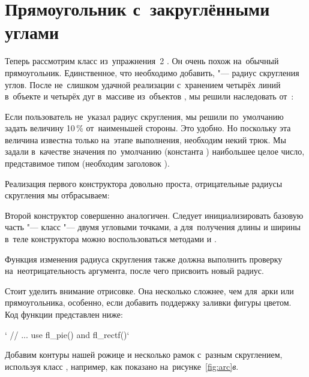 \section{Прямоугольник с~закруглёнными углами}
Теперь рассмотрим класс  из~упражнения~2 . Он очень похож на~обычный прямоугольник. Единственное, что необходимо добавить, "--- радиус скругления углов. После не~слишком удачной реализации с~хранением четырёх линий в~объекте  и четырёх дуг в~массиве из~объектов , мы решили наследовать от~:


Если пользователь не~указал радиус скругления, мы решили по~умолчанию задать величину 10\,\% от~наименьшей стороны. Это удобно. Но поскольку эта величина известна только на~этапе выполнения, необходим некий трюк. Мы задали в~качестве значения по~умолчанию (константа ) наибольшее целое число, представимое типом  (необходим заголовок ).

Реализация первого конструктора довольно проста, отрицательные радиусы скругления мы отбрасываем:


Второй конструктор совершенно аналогичен. Следует инициализировать базовую часть "--- класс  "--- двумя угловыми точками, а для~получения длины и ширины в~теле конструктора можно воспользоваться методами  и .

Функция изменения радиуса скругления  также должна выполнить проверку на~неотрицательность аргумента, после чего присвоить новый радиус.

Стоит уделить внимание отрисовке. Она несколько сложнее, чем для~арки или прямоугольника, особенно, если добавить поддержку заливки фигуры цветом. Код функции представлен ниже:

\cpp`    // ... use fl_pie() and fl_rectf()`

Добавим контуры нашей рожице и несколько рамок с~разным скруглением, используя класс , например, как показано на~рисунке~\ref{fig:arc}\textit{в}.



